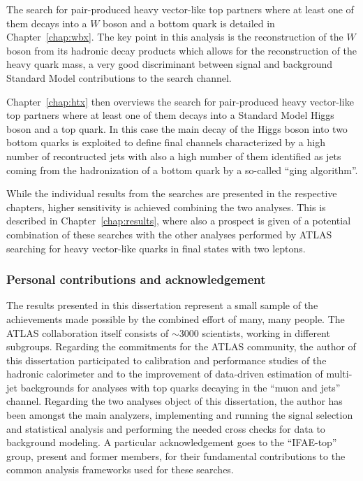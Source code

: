 The search for pair-produced heavy vector-like top partners
where at least one of them decays into a $W$ boson and a bottom
quark is detailed in Chapter~\ref{chap:wbx}. The key point in
this analysis is the reconstruction of the $W$ boson from its
hadronic decay products which allows for the reconstruction
of the heavy quark mass, a very good discriminant between
signal and background Standard Model contributions to the
search channel.

Chapter~\ref{chap:htx} then overviews the search for 
pair-produced heavy vector-like top partners
where at least one of them decays into a Standard Model Higgs
boson and a top quark. In this case the main decay of the Higgs
boson into two bottom quarks is exploited to define 
final channels characterized by a high number of recontructed
jets with also a high number of them identified as jets coming
from the hadronization of a bottom quark by a so-called
``\btag ging algorithm''.

While the individual results from the searches
are presented in the respective chapters, higher
sensitivity is achieved combining the two analyses.
This is described in Chapter~\ref{chap:results},
where also a prospect is given of a potential combination
of these searches with the other analyses performed
by ATLAS searching for heavy vector-like quarks
in final states with two leptons.






\subsubsection*{Personal contributions and acknowledgement}

The results presented in this dissertation represent
a small sample of the achievements made possible by
the combined effort of many, many people. The ATLAS
collaboration itself consists of $\sim$3000 scientists,
working in different subgroups. 
Regarding the commitments for the ATLAS community, the 
author of this dissertation participated to calibration
and performance studies of the hadronic calorimeter
and to the improvement of data-driven estimation of
multi-jet backgrounds for analyses with top quarks 
decaying in the ``muon and jets'' channel. Regarding
the two analyses object of this dissertation, the author
has been amongst the main analyzers, implementing and
running the signal selection and statistical analysis and
performing the needed cross checks for data to background
modeling. %
A particular acknowledgement goes to the ``IFAE-top''
group, present and former members, for their fundamental
contributions to the common analysis frameworks used
for these searches.

